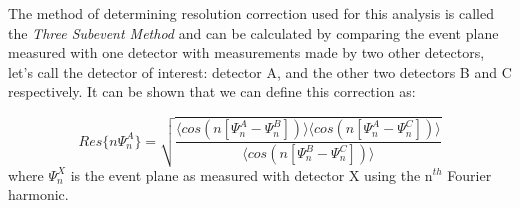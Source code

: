 The method of determining resolution correction used for this analysis is called the \textit{Three Subevent Method} and can be calculated by comparing the event plane measured with one detector with measurements made by two other detectors, let's call the detector of interest: detector A, and the other two detectors B and C respectively. It can be shown \citep{PhysRevC.58.1671} that we can define this correction as:

\begin{equation}
Res\{n \Psi_n^{A}\} = \sqrt{\frac{\langle cos(n[\Psi_n^{A}-\Psi_n^{B}])\rangle \langle cos(n[\Psi_n^{A}-\Psi_n^{C}])\rangle}{\langle cos(n[\Psi_n^{B}-\Psi_n^{C}])\rangle}}
\end{equation} 
where $\Psi_n^X$ is the event plane as measured with detector X using the n$^{th}$ Fourier harmonic.
\pagebreak
\pagebreak
